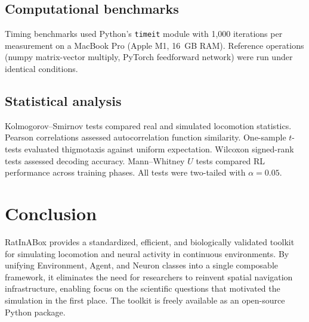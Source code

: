\documentclass[11pt]{article}
\begin{document}
\subsection{Computational benchmarks}

Timing benchmarks used Python's \texttt{timeit} module with 1{,}000 iterations per measurement on a MacBook Pro (Apple M1, 16~GB RAM). Reference operations (numpy matrix-vector multiply, PyTorch feedforward network) were run under identical conditions.

\subsection{Statistical analysis}

Kolmogorov--Smirnov tests compared real and simulated locomotion statistics. Pearson correlations assessed autocorrelation function similarity. One-sample $t$-tests evaluated thigmotaxis against uniform expectation. Wilcoxon signed-rank tests assessed decoding accuracy. Mann--Whitney $U$ tests compared RL performance across training phases. All tests were two-tailed with $\alpha = 0.05$.

\section{Conclusion}

RatInABox provides a standardized, efficient, and biologically validated toolkit for simulating locomotion and neural activity in continuous environments. By unifying Environment, Agent, and Neuron classes into a single composable framework, it eliminates the need for researchers to reinvent spatial navigation infrastructure, enabling focus on the scientific questions that motivated the simulation in the first place. The toolkit is freely available as an open-source Python package.



\end{document}
